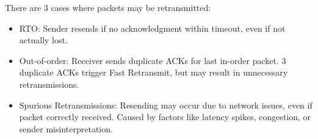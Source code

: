 There are 3 cases where packets may be retransmitted:

\begin{itemize}
    \item RTO: Sender resends if no acknowledgment within timeout, even if not actually lost.

    \item Out-of-order: Receiver sends duplicate ACKs for last in-order packet. 3 duplicate ACKs trigger Fast Retransmit, but may result in unnecessary retransmissions.

    \item Spurious Retransmissions: Resending may occur due to network issues, even if packet correctly received. Caused by factors like latency spikes, congestion, or sender misinterpretation.
\end{itemize}